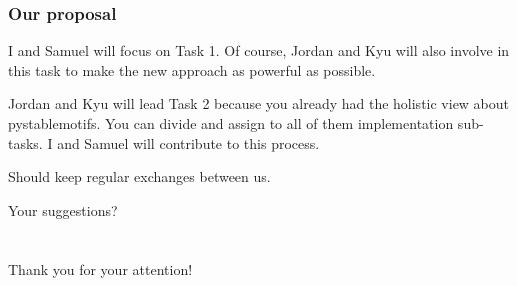 \documentclass{beamer}              %
\begin{document}
\begin{frame}
\frametitle{Our proposal}

I and Samuel will focus on Task 1.
Of course, Jordan and Kyu will also involve in this task to make the new approach as powerful as possible.

\hspace{0.8cm}

Jordan and Kyu will lead Task 2 because you already had the holistic view about pystablemotifs.
You can divide and assign to all of them implementation sub-tasks.
I and Samuel will contribute to this process.

\hspace{0.8cm}

Should keep regular exchanges between us.

\hspace{0.8cm}

Your suggestions?

\end{frame}

\section*{}
\begin{frame}
  \begin{center}
	  \Large{Thank you for your attention!}
	\end{center}
\end{frame}
\end{document}
